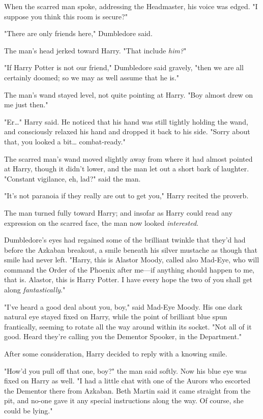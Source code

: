 When the scarred man spoke, addressing the Headmaster, his voice was edged. "I 
suppose you think this room is secure?"

"There are only friends here," Dumbledore said.

The man's head jerked toward Harry. "That include \emph{him?}"

"If Harry Potter is not our friend," Dumbledore said gravely, "then we are all 
certainly doomed; so we may as well assume that he is."

The man's wand stayed level, not quite pointing at Harry. "Boy almost drew on 
me just then."

"Er{\ldots}" Harry said. He noticed that his hand was still tightly holding the 
wand, and consciously relaxed his hand and dropped it back to his side. "Sorry 
about that, you looked a bit{\ldots} combat-ready."

The scarred man's wand moved slightly away from where it had almost pointed at 
Harry, though it didn't lower, and the man let out a short bark of laughter. 
"Constant vigilance, eh, lad?" said the man.

"It's not paranoia if they really are out to get you," Harry recited the 
proverb.

The man turned fully toward Harry; and insofar as Harry could read any 
expression on the scarred face, the man now looked \emph{interested}.

Dumbledore's eyes had regained some of the brilliant twinkle that they'd had 
before the Azkaban breakout, a smile beneath his silver mustache as though that 
smile had never left. "Harry, this is Alastor Moody, called also Mad-Eye, who 
will command the Order of the Phoenix after me---if anything should happen to 
me, that is. Alastor, this is Harry Potter. I have every hope the two of you 
shall get along \emph{fantastically}."

"I've heard a good deal about you, boy," said Mad-Eye Moody. His one dark 
natural eye stayed fixed on Harry, while the point of brilliant blue spun 
frantically, seeming to rotate all the way around within its socket. "Not all 
of it good. Heard they're calling you the Dementor Spooker, in the Department."

After some consideration, Harry decided to reply with a knowing smile.

"How'd you pull off that one, boy?" the man said softly. Now his blue eye was 
fixed on Harry as well. "I had a little chat with one of the Aurors who 
escorted the Dementor there from Azkaban. Beth Martin said it came straight 
from the pit, and no-one gave it any special instructions along the way. Of 
course, she could be lying."

